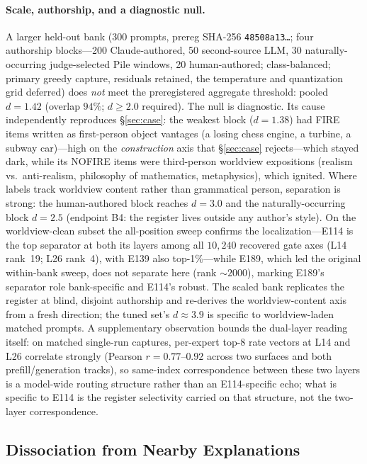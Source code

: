 \documentclass[10pt,a4paper,twocolumn]{article}
\begin{document}
\paragraph{Scale, authorship, and a diagnostic null.}
A larger held-out bank (300 prompts, prereg SHA-256 \texttt{48508a13\ldots};
four authorship blocks---200 Claude-authored, 50 second-source LLM, 30
naturally-occurring judge-selected Pile windows, 20 human-authored;
class-balanced; primary greedy capture, residuals retained, the temperature and
quantization grid deferred) does \emph{not} meet the preregistered aggregate
threshold: pooled $d{=}1.42$ (overlap $94\%$; $d{\ge}2.0$ required). The null is
diagnostic. Its cause independently reproduces \S\ref{sec:case}: the weakest
block ($d{=}1.38$) had FIRE items written as first-person object vantages (a
losing chess engine, a turbine, a subway car)---high on the \emph{construction}
axis that \S\ref{sec:case} rejects---which stayed dark, while its NOFIRE items
were third-person worldview expositions (realism vs.\ anti-realism, philosophy
of mathematics, metaphysics), which ignited. Where labels track worldview
content rather than grammatical person, separation is strong: the human-authored
block reaches $d{=}3.0$ and the naturally-occurring block $d{=}2.5$ (endpoint
B4: the register lives outside any author's style). On the worldview-clean
subset the all-position sweep confirms the localization---E114 is the top
separator at both its layers among all $10{,}240$ recovered gate axes (L14
rank~19; L26 rank~4), with E139 also top-1\%---while E189, which led the original
within-bank sweep, does not separate here (rank ${\sim}2000$), marking E189's
separator role bank-specific and E114's robust. The scaled bank replicates the
register at blind, disjoint authorship and re-derives the worldview-content axis
from a fresh direction; the tuned set's $d{\approx}3.9$ is specific to
worldview-laden matched prompts.
A supplementary observation bounds the dual-layer reading itself: on matched
single-run captures, per-expert top-8 rate vectors at L14 and L26 correlate
strongly (Pearson $r{=}0.77$--$0.92$ across two surfaces and both
prefill/generation tracks), so same-index correspondence between these two
layers is a model-wide routing structure rather than an E114-specific echo;
what is specific to E114 is the register selectivity carried on that
structure, not the two-layer correspondence.

\subsection{Dissociation from Nearby Explanations}
\end{document}
